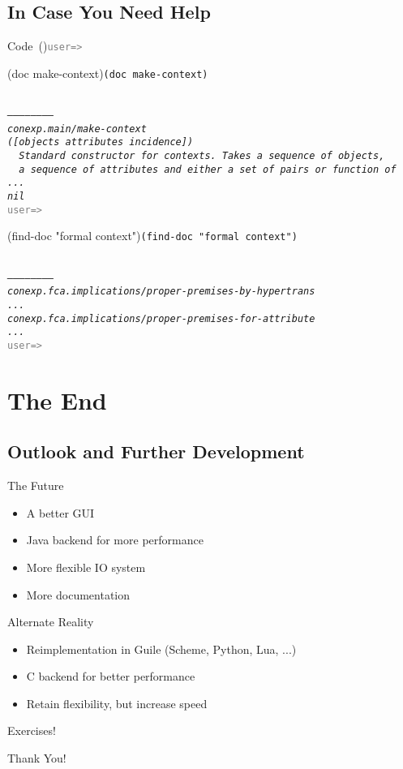 \documentclass{beamer}
\newenvironment{code}[1]{\begin{block}{Code\ifx#1\empty\else~(#1)\fi}\prompt}{\end{block}}
\newcommand{\prompt}{\texttt{\textcolor{gray}{user=>}}}
\newcommand{\codeinput}[1]{\parbox[t]{0.8\linewidth}{\ifx#1\empty\else\lstinline{#1}\fi}\\}
\newcommand{\codeoutput}[1]{\textit{\texttt{#1}}\\\prompt}
\newcommand{\codeio}[2]{\onslide<+->\codeinput{#1}\onslide<+->\codeoutput{#2}}
\begin{document}
\subsection{In Case You Need Help}

\begin{frame}

  \onslide<+->

  \begin{code}{}
    \codeio{(doc make-context)}{------------------------\\
      conexp.main/make-context\\
      ([objects attributes incidence])\\
      \ \ Standard constructor for contexts. Takes a sequence of objects,\\
      \ \ a sequence of attributes and either a set of pairs or function of\\
      ...\\
      nil}
    \codeio{(find-doc "formal context")}{------------------------\\
      conexp.fca.implications/proper-premises-by-hypertrans\\
      ...\\
      conexp.fca.implications/proper-premises-for-attribute\\
      ...
    }
  \end{code}  
\end{frame}

\section{The End}

\subsection{Outlook and Further Development}

\begin{frame}
  \onslide<+->
  \begin{block}{The Future}
    \begin{itemize}
    \item<+-> A better GUI
    \item<+-> Java backend for more performance
    \item<+-> More flexible IO system
    \item<+-> More documentation
    \end{itemize}
  \end{block}
  \onslide<+->
  \begin{block}{Alternate Reality}
    \begin{itemize}
    \item<+-> Reimplementation in Guile (Scheme, Python, Lua, ...)
    \item<+-> C backend for better performance
    \item<+-> Retain flexibility, but increase speed
    \end{itemize}
  \end{block}
\end{frame}

\begin{frame}
  \centerline{Exercises!}
\end{frame}

\begin{frame}
  \centerline{Thank You!}
\end{frame}
\end{document}
